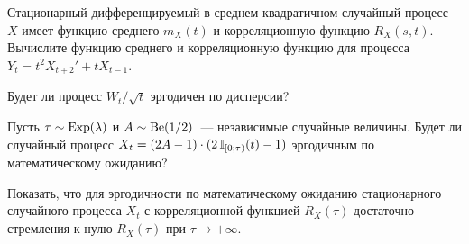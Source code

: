 \documentclass[12pt]{article}
\def\canon{\textbf{(каноническое задание)}}
\begin{document}
\begin{exercise}
    Стационарный дифференцируемый в среднем квадратичном случайный процесс $ X $
    имеет функцию среднего $ m_X(t) $ и корреляционную функцию $ R_X(s, t) $.
    Вычислите функцию среднего и корреляционную функцию для процесса $ Y_t = t^2 X_{t + 2}' + t X_{t - 1} $.
\end{exercise}


\begin{exercise}
    Будет ли процесс $ W_t / \sqrt{t} $ эргодичен по дисперсии?
\end{exercise}


\begin{exercise}
    Пусть $ \tau \sim \textnormal{Exp}(\lambda) $ и $ A \sim \textnormal{Be}(1/2) $~--- независимые случайные величины.
    Будет ли случайный процесс $ X_t = (2A - 1) \cdot (2 \, \mathbb{I}_{[0;\tau)}(t) - 1) $ эргодичным по математическому ожиданию?
\end{exercise}


\begin{exercise}
    Показать, что для эргодичности по математическому ожиданию стационарного случайного процесса $ X_t $
    с корреляционной функцией $ R_X(\tau) $ достаточно стремления к нулю $ R_X(\tau) $ при $ \tau \to +\infty $.
\end{exercise}

\newpage




\begin{exercise}[subtitle={\canon}]
\end{exercise}


\begin{exercise}[subtitle={\canon}]
\end{exercise}


\begin{exercise}[subtitle={\canon}]
\end{exercise}


\begin{exercise}[subtitle={\canon}]
\end{exercise}


\begin{exercise}[subtitle={\canon}]
\end{exercise}


\begin{exercise}
\end{exercise}


\begin{exercise}
\end{exercise}


\begin{exercise}
\end{exercise}


\begin{exercise}
\end{exercise}
\end{document}

